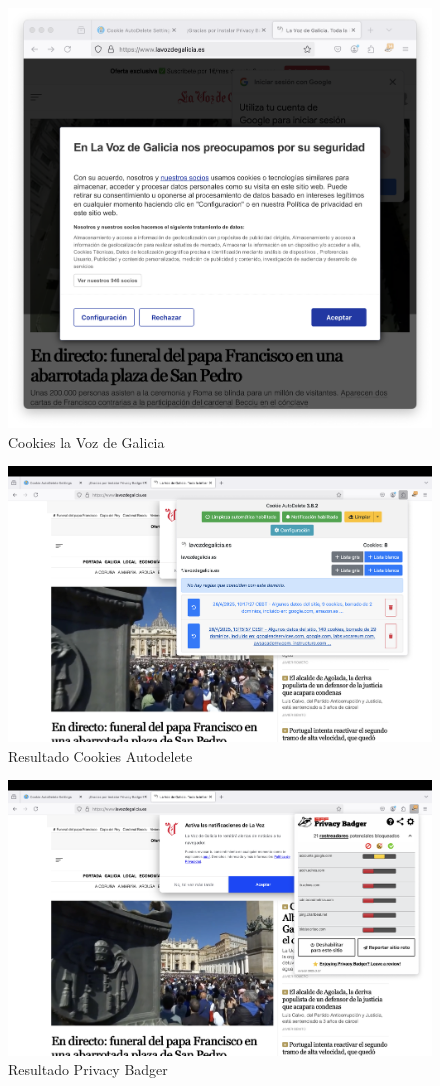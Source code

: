 \begin{figure}[H]   
    \includegraphics[width=15cm]{cookies_lavoz.png}
    \caption{Cookies la Voz de Galicia}
    \label{fig:cookies_lavoz}
\end{figure}

\begin{figure}[H]   
    \includegraphics[width=15cm]{resultado_cookies_autodelete.png}
    \caption{Resultado Cookies Autodelete}
    \label{fig:resultado_cookies_autodelete}
\end{figure}

\begin{figure}[H]   
    \includegraphics[width=15cm]{resultado_privacybadger.png}
    \caption{Resultado Privacy Badger}
    \label{fig:resultado_privacybadger}
\end{figure}
